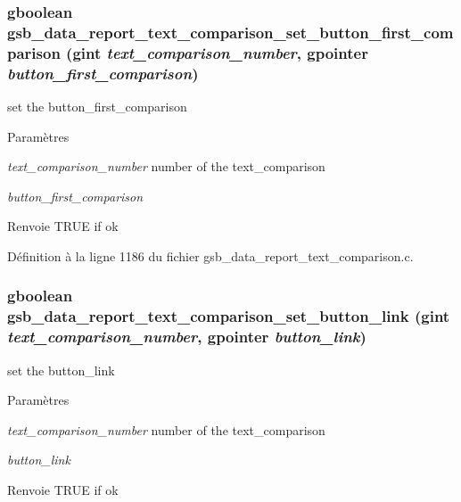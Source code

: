 \subsubsection[{gsb\_\-data\_\-report\_\-text\_\-comparison\_\-set\_\-button\_\-first\_\-comparison}]{\setlength{\rightskip}{0pt plus 5cm}gboolean gsb\_\-data\_\-report\_\-text\_\-comparison\_\-set\_\-button\_\-first\_\-comparison (gint {\em text\_\-comparison\_\-number}, \/  gpointer {\em button\_\-first\_\-comparison})}\label{gsb__data__report__text__comparison_8c_ae906258924ec87f65f82274c9cd98681}
set the button\_\-first\_\-comparison


\begin{DoxyParams}{Paramètres}
\item[{\em text\_\-comparison\_\-number}]number of the text\_\-comparison \item[{\em button\_\-first\_\-comparison}]\end{DoxyParams}
\begin{DoxyReturn}{Renvoie}
TRUE if ok 
\end{DoxyReturn}


Définition à la ligne 1186 du fichier gsb\_\-data\_\-report\_\-text\_\-comparison.c.

\subsubsection[{gsb\_\-data\_\-report\_\-text\_\-comparison\_\-set\_\-button\_\-link}]{\setlength{\rightskip}{0pt plus 5cm}gboolean gsb\_\-data\_\-report\_\-text\_\-comparison\_\-set\_\-button\_\-link (gint {\em text\_\-comparison\_\-number}, \/  gpointer {\em button\_\-link})}\label{gsb__data__report__text__comparison_8c_a8a3e2ddf2fb6acb0f2bb18df643f9d88}
set the button\_\-link


\begin{DoxyParams}{Paramètres}
\item[{\em text\_\-comparison\_\-number}]number of the text\_\-comparison \item[{\em button\_\-link}]\end{DoxyParams}
\begin{DoxyReturn}{Renvoie}
TRUE if ok 
\end{DoxyReturn}


